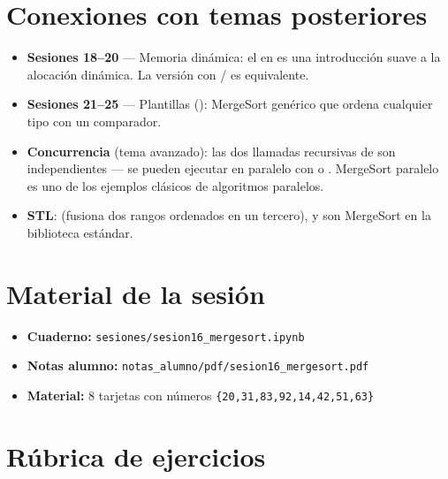 \documentclass[12pt, oneside]{article}
\begin{document}
\section{Conexiones con temas posteriores}

\begin{itemize}
  \item \textbf{Sesiones 18--20} — Memoria dinámica: el 
    en  es una introducción suave a la alocación dinámica.
    La versión con  /  es equivalente.
  \item \textbf{Sesiones 21--25} — Plantillas ():
    MergeSort genérico que ordena cualquier tipo con un comparador.
  \item \textbf{Concurrencia} (tema avanzado): las dos llamadas recursivas de
     son independientes — se pueden ejecutar en paralelo con
     o . MergeSort paralelo es uno de los
    ejemplos clásicos de algoritmos paralelos.
  \item \textbf{STL}:  (fusiona dos rangos ordenados en un
    tercero),  y  son
    MergeSort en la biblioteca estándar.
\end{itemize}

\section{Material de la sesión}

\begin{itemize}
  \item \textbf{Cuaderno:} \texttt{sesiones/sesion16\_mergesort.ipynb}
  \item \textbf{Notas alumno:} \texttt{notas\_alumno/pdf/sesion16\_mergesort.pdf}
  \item \textbf{Material:} 8 tarjetas con números
        \texttt{\{20,31,83,92,14,42,51,63\}}
\end{itemize}

\section{Rúbrica de ejercicios}
\end{document}
